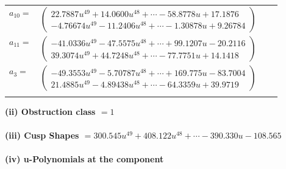 \documentclass[1p]{elsarticle_modified}
\theoremstyle{definition}
\begin{document}
\begin{tabular}{m{7pt} m{180pt} m{7pt} m{180pt} }
\flushright $a_{10}=$&$\begin{pmatrix}22.7887 u^{49}+14.0600 u^{48}+\cdots-58.8778 u+17.1876\\-4.76674 u^{49}-11.2406 u^{48}+\cdots-1.30878 u+9.26784\end{pmatrix}$ \\
\flushright $a_{11}=$&$\begin{pmatrix}-41.0336 u^{49}-47.5575 u^{48}+\cdots+99.1207 u-20.2116\\39.3074 u^{49}+44.7248 u^{48}+\cdots-77.7751 u+14.1418\end{pmatrix}$ \\
\flushright $a_{3}=$&$\begin{pmatrix}-49.3553 u^{49}-5.70787 u^{48}+\cdots+169.775 u-83.7004\\21.4885 u^{49}-4.89438 u^{48}+\cdots-64.3359 u+39.9719\end{pmatrix}$\\&\end{tabular}
\flushleft \textbf{(ii) Obstruction class $= 1$}\\~\\
\flushleft \textbf{(iii) Cusp Shapes $= 300.545 u^{49}+408.122 u^{48}+\cdots-390.330 u-108.565$}\\~\\
\newpage\renewcommand{\arraystretch}{1}
\flushleft \textbf{(iv) u-Polynomials at the component}\newline \\
\end{document}
